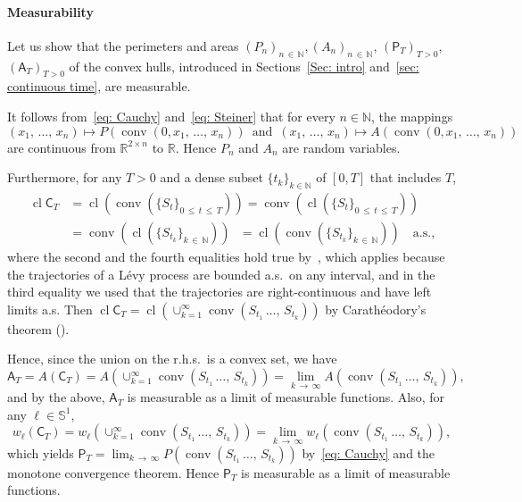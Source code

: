 \documentclass[10pt]{amsart}
\theoremstyle{definition}\newtheorem{defi}[theo]{Definition}\newtheorem{rema}[theo]{Remark}\newtheorem{exam}[theo]{Example}\newtheorem{exem}[theo]{Example}\newtheorem{nota}[theo]{Notation}
\DeclareMathOperator{\conv}{conv}
\DeclareMathOperator{\cl}{cl}
\newcommand{\Rbb}{\mathbb{R}}
\newcommand{\N}{\mathbb{N}}
\newcommand{\Sbb}{\mathbb{S}}
\newcommand{\sfC}{\mathsf{C}}
\newcommand{\sfP}{\mathsf{P}}
\newcommand{\sfA}{\mathsf{A}}
\begin{document}
\paragraph{Measurability}
Let us show that the perimeters and areas $(P_n)_{n\,\in\,\N}, (A_n)_{n\,\in\,\N}$, $(\sfP_T)_{T >0}$, $(\sfA_T)_{T >0}$ of the convex hulls, introduced in Sections~\ref{Sec: intro} and~\ref{sec: continuous time}, are measurable.

It follows from~\eqref{eq: Cauchy} and~\eqref{eq: Steiner} that for every $n \in \N$, the mappings
\[
(x_1,\,\ldots,\,x_n) \mapsto P(\conv(0, x_1,\,\ldots,\,x_n)) \, \text{ and } \, (x_1,\,\ldots,\,x_n) \mapsto A(\conv(0, x_1,\, \ldots,\,x_n))
\]
are continuous from $\Rbb^{2 \times n} $ to $\Rbb$. Hence $P_n$ and $A_n$ are random variables.

Furthermore, for any $T>0$ and a dense subset $\{t_k\}_{k \in \N}$ of $[0, T]$ that includes $T$,
\begin{align*}
\cl \sfC_T &= \cl (\conv(\{S_t\}_{0\,\le\,t\,\le\,T}))= \conv (\cl (\{S_t\}_{0\,\le\,t\,\le\,T})) \\
&= \conv (\cl (\{S_{t_k}\}_{k\,\in\,\N}))\;\:\, = \cl (\conv (\{S_{t_k}\}_{k\,\in\,\N}))
\quad \text{a.s.,}
\end{align*}
where the second and the fourth equalities hold true by~\cite[Theorem~17.2]{Rockafellar}, which applies because the trajectories of a L\'evy process are bounded a.s.\ on any interval, and in the third equality we used that the trajectories are right-continuous and have left limits a.s. Then $\cl \sfC_T= \cl (\cup_{k=1}^\infty \conv (S_{t_1}\,\ldots,\,S_{t_k}))$ by Carath\'eodory's theorem (\cite[Theorem~17.1]{Rockafellar}).

Hence, since the union on the r.h.s.\ is a convex set, we have
\[
\sfA_T=A(\sfC_T)= A \left(\mathop\cup_{k=1}^\infty \conv \left(S_{t_1} \,\ldots,\,S_{t_k}\right)\right) = \lim_{k\,\to\,\infty}A\left(\conv \left(S_{t_1}\,\ldots,\,S_{t_k}\right)\right),
\]
and by the above, $\sfA_T$ is measurable as a limit of measurable functions. Also, for any $\ell \in \Sbb^1$,
\[
w_\ell (\sfC_T)= w_\ell \left(\mathop\cup_{k=1}^\infty \conv \left(S_{t_1}\,\ldots,\,S_{t_k}\right)\right)= \lim_{k\,\to\, \infty} w_\ell \left(\conv \left(S_{t_1}\,\ldots,\,S_{t_k}\right)\right),
\]
which yields $\sfP_T = \lim_{k\,\to\,\infty}P(\conv (S_{t_1}\, \ldots,\,S_{t_k}))$ by~\eqref{eq: Cauchy} and the monotone convergence theorem. Hence $\sfP_T $ is measurable as a limit of measurable functions.
\end{document}
